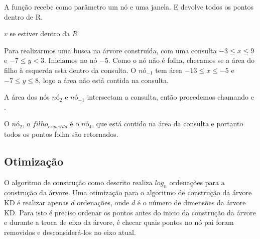 \begin{algorithm}[H]
    \caption{A função  recebe como parâmetro um nó e uma 
    janela.
     E devolve todos os pontos dentro de R.}
    \begin{algorithmic}[1]
        \Return  $v$ se estiver dentro da $R$
        \Else
            \State \Return {}
            \Else
                \State \Return {}
                \EndIf
            \EndIf
                \State {}
            \Else
                \State \Return {}
                \EndIf
            \EndIf
        \EndIf
    \EndFunction
    \end{algorithmic}
\end{algorithm}

Para realizarmos uma busca na árvore construída, com uma consulta $ -3 \leq x \leq 9 $ e $-7 \leq y < 3$.
Iniciamos no nó $-5$. Como o nó não é folha, checamos se a área do filho à esquerda esta dentro da consulta.
O $nó_{-1}$ tem área $ -13 \leq x \leq -5 $ e  $ -7 \leq y \leq 8$, logo a área não está contida 
na consulta.

A área dos nós $nó_2$ e $nó_{-1}$ intersectam a consulta, então procedemos chamando
 e .

O $nó_{2}$, o $filho_{esquerda}$ é o $nó_4$, que está contido na área da consulta e portanto todos
os pontos folha são retornados.

\subsection{Otimização}
O algoritmo de construção como descrito realiza $log_n$ ordenações para a construção da árvore.
Uma otimização para o algoritmo de construção da árvore KD é realizar apenas $d$ ordenações, onde $d$
é o número de dimensões da árvore KD.
Para isto é preciso ordenar os pontos antes do inicio da construção da árvore e durante a troca de eixo
da árvore, é checar quais pontos no nó pai foram removidos e desconsiderá-los no eixo atual.

